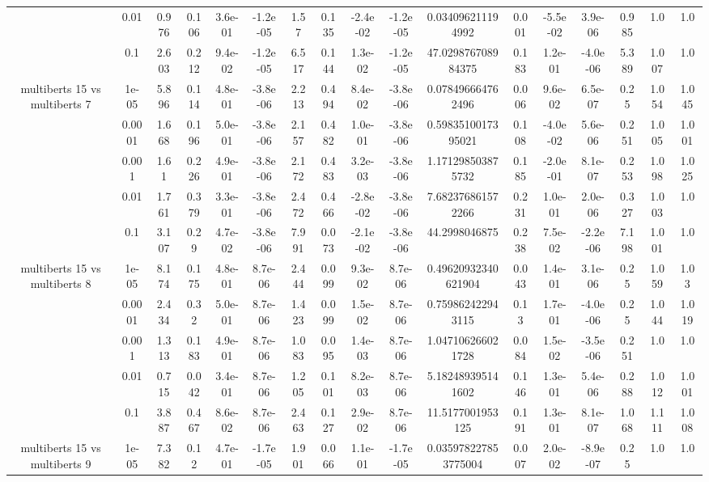 \begin{tabular}{|c|c|c|c|c|c|c|c|c|c|c|c|c|c|c|c|c|}
 & 0.01 & 0.976 & 0.106 & 3.6e-01 & -1.2e-05 & 1.57 & 0.135 & -2.4e-02 & -1.2e-05 & 0.034096211194992 & 0.001 & -5.5e-02 & 3.9e-06 & 0.985 & 1.0 & 1.0 \\
 & 0.1 & 2.603 & 0.212 & 9.4e-02 & -1.2e-05 & 6.517 & 0.144 & 1.3e-02 & -1.2e-05 & 47.029876708984375 & 0.183 & 1.2e-01 & -4.0e-06 & 5.389 & 1.007 & 1.0 \\
\hline
\multirow{5}{*}{multiberts 15 vs multiberts 7} & 1e-05 & 5.896 & 0.114 & 4.8e-01 & -3.8e-06 & 2.213 & 0.494 & 8.4e-02 & -3.8e-06 & 0.078496664762496 & 0.006 & 9.6e-02 & 6.5e-07 & 0.25 & 1.054 & 1.045 \\
 & 0.0001 & 1.668 & 0.196 & 5.0e-01 & -3.8e-06 & 2.157 & 0.482 & 1.0e-01 & -3.8e-06 & 0.5983510017395021 & 0.108 & -4.0e-02 & 5.6e-06 & 0.251 & 1.005 & 1.001 \\
 & 0.001 & 1.61 & 0.226 & 4.9e-01 & -3.8e-06 & 2.172 & 0.483 & 3.2e-03 & -3.8e-06 & 1.171298503875732 & 0.185 & -2.0e-01 & 8.1e-07 & 0.253 & 1.098 & 1.025 \\
 & 0.01 & 1.761 & 0.379 & 3.3e-01 & -3.8e-06 & 2.472 & 0.466 & -2.8e-02 & -3.8e-06 & 7.682376861572266 & 0.231 & 1.0e-01 & 2.0e-06 & 0.327 & 1.003 & 1.0 \\
 & 0.1 & 3.107 & 0.29 & 4.7e-02 & -3.8e-06 & 7.991 & 0.073 & -2.1e-02 & -3.8e-06 & 44.2998046875 & 0.238 & 7.5e-02 & -2.2e-06 & 7.198 & 1.001 & 1.0 \\
\hline
\multirow{5}{*}{multiberts 15 vs multiberts 8} & 1e-05 & 8.174 & 0.175 & 4.8e-01 & 8.7e-06 & 2.444 & 0.099 & 9.3e-02 & 8.7e-06 & 0.49620932340621904 & 0.043 & 1.4e-01 & 3.1e-06 & 0.25 & 1.059 & 1.03 \\
 & 0.0001 & 2.434 & 0.32 & 5.0e-01 & 8.7e-06 & 1.423 & 0.099 & 1.5e-02 & 8.7e-06 & 0.759862422943115 & 0.13 & 1.7e-01 & -4.0e-06 & 0.25 & 1.044 & 1.019 \\
 & 0.001 & 1.313 & 0.183 & 4.9e-01 & 8.7e-06 & 1.083 & 0.095 & 1.4e-03 & 8.7e-06 & 1.047106266021728 & 0.084 & 1.5e-02 & -3.5e-06 & 0.251 & 1.0 & 1.0 \\
 & 0.01 & 0.715 & 0.042 & 3.4e-01 & 8.7e-06 & 1.205 & 0.101 & 8.2e-03 & 8.7e-06 & 5.182489395141602 & 0.146 & 1.3e-01 & 5.4e-06 & 0.288 & 1.012 & 1.001 \\
 & 0.1 & 3.887 & 0.467 & 8.6e-02 & 8.7e-06 & 2.463 & 0.127 & 2.9e-02 & 8.7e-06 & 11.5177001953125 & 0.191 & 1.3e-01 & 8.1e-07 & 1.068 & 1.111 & 1.008 \\
\hline
\multirow{5}{*}{multiberts 15 vs multiberts 9} & 1e-05 & 7.382 & 0.12 & 4.7e-01 & -1.7e-05 & 1.901 & 0.066 & 1.1e-01 & -1.7e-05 & 0.035978227853775004 & 0.007 & 2.0e-02 & -8.9e-07 & 0.25 & 1.0 & 1.0 \\

\end{tabular}
